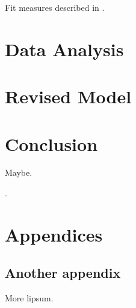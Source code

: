 \documentclass[11pt]{article}
\begin{document}
Fit measures described in \cite{parryFitIndicesCommonly2020}.

\section{Data Analysis}

\section{Revised Model}

\section{Conclusion}
Maybe.

\clearpage

\appendix

\renewcommand{\refname}{\section{References}}.



\section{Appendices}


\subsection{Another appendix}

More lipsum.
\end{document}
